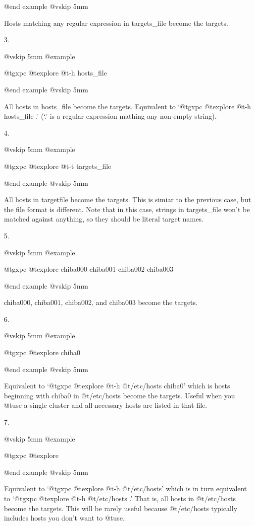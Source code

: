 @end example
@vskip 5mm

Hosts matching any regular expression in targets_file become
the targets.

3.

@vskip 5mm
@example

  @t{gxpc} @t{explore} @t{-h} hosts_file

@end example
@vskip 5mm

All hosts in hosts_file become the targets.  Equivalent to `@t{gxpc}
@t{explore} @t{-h} hosts_file .'  (`.' is a regular expression mathing
any non-empty string).

4.

@vskip 5mm
@example

  @t{gxpc} @t{explore} @t{-t} targets_file

@end example
@vskip 5mm

All hosts in targetfile become the targets. This is simiar to the
previous case, but the file format is different.  Note that in
this case, strings in targets_file won't be matched against
anything, so they should be literal target names.
     
5.

@vskip 5mm
@example

  @t{gxpc} @t{explore} chiba000 chiba001 chiba002 chiba003

@end example
@vskip 5mm

chiba000, chiba001, chiba002, and chiba003 become the targets.

6.

@vskip 5mm
@example

  @t{gxpc} @t{explore} chiba0

@end example
@vskip 5mm

Equivalent to `@t{gxpc} @t{explore} @t{-h} @t{/etc/hosts} chiba0' which is hosts
beginning with chiba0 in @t{/etc/hosts} become the targets. Useful
when you @t{use} a single cluster and all necessary hosts are listed
in that file.
     
7.

@vskip 5mm
@example

  @t{gxpc} @t{explore}

@end example
@vskip 5mm

Equivalent to `@t{gxpc} @t{explore} @t{-h} @t{/etc/hosts}' which is in turn
equivalent to `@t{gxpc} @t{explore} @t{-h} @t{/etc/hosts} .'  That is, all hosts
in @t{/etc/hosts} become the targets.  This will be rarely useful
because @t{/etc/hosts} typically includes hosts you don't want to
@t{use}.

